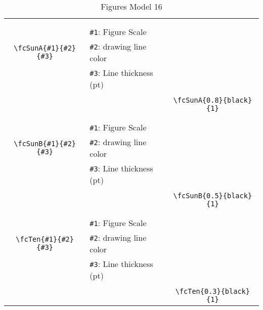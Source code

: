 \documentclass[x11names]{article}
\begin{document}
\begin{table}[H]
\begin{tabular}{|c|l|c|}
	&&\multirow{5}{*}{\fcSunA{0.8}{black}{1}}\\	&&\\	&\verb|#1|: Figure Scale &\\	\verb|\fcSunA{#1}{#2}{#3}|&	\verb|#2|: drawing line color &\\	&\verb|#3|: Line thickness (pt) &\\ &&\\&&	\verb|\fcSunA{0.8}{black}{1}|\\\hline 	
	&&\multirow{5}{*}{\fcSunB{0.5}{black}{1}}\\	&&\\	&\verb|#1|: Figure Scale &\\	\verb|\fcSunB{#1}{#2}{#3}|&	\verb|#2|: drawing line color &\\	&\verb|#3|: Line thickness (pt) &\\ &&\\&&	\verb|\fcSunB{0.5}{black}{1}|\\\hline 	
	&&\multirow{5}{*}{\fcTen{0.3}{black}{1}}\\	&&\\	&\verb|#1|: Figure Scale &\\	\verb|\fcTen{#1}{#2}{#3}|&	\verb|#2|: drawing line color &\\	&\verb|#3|: Line thickness (pt) &\\ &&\\&&	\verb|\fcTen{0.3}{black}{1}|\\\hline 	\hline\end{tabular}\caption{Figures Model 16}\label{tab16}\end{table}
\end{document}
